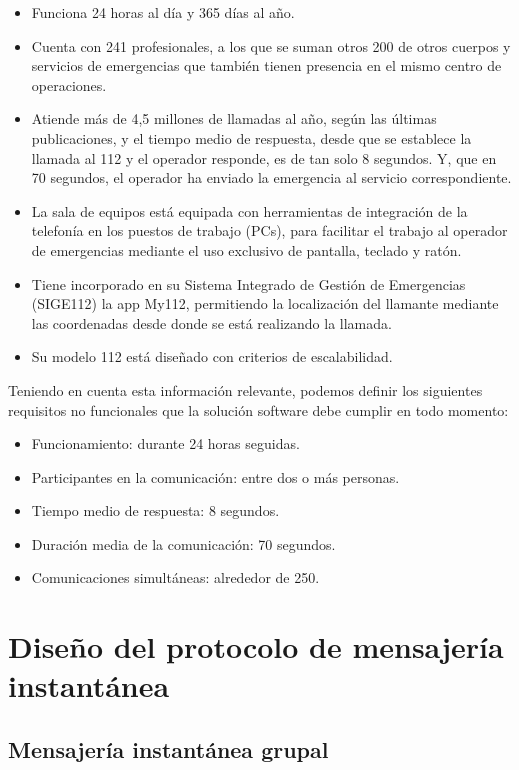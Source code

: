 \begin{itemize}
  \item Funciona 24 horas al día y 365 días al año.
  \item Cuenta con 241 profesionales, a los que se suman otros 200 de otros cuerpos y servicios de emergencias que también tienen presencia en el mismo centro de operaciones.
  \item Atiende más de 4,5 millones de llamadas al año, según las últimas publicaciones, y el tiempo medio de respuesta, desde que se establece la llamada al 112 y el operador responde, es de tan solo 8 segundos. Y, que en 70 segundos, el operador ha enviado la emergencia al servicio correspondiente.
  \item La sala de equipos está equipada con herramientas de integración de la telefonía en los puestos de trabajo (PCs), para facilitar el trabajo al operador de emergencias mediante el uso exclusivo de pantalla, teclado y ratón.
  \item Tiene incorporado en su Sistema Integrado de Gestión de Emergencias (SIGE112) la app My112, permitiendo la localización del llamante mediante las coordenadas desde donde se está realizando la llamada.
  \item Su modelo 112 está diseñado con criterios de escalabilidad.
\end{itemize}

Teniendo en cuenta esta información relevante, podemos definir los siguientes requisitos no funcionales que la solución software debe cumplir en todo momento:

\begin{itemize}
  \item Funcionamiento: durante 24 horas seguidas.
  \item Participantes en la comunicación: entre dos o más personas.
  \item Tiempo medio de respuesta: 8 segundos.
  \item Duración media de la comunicación: 70 segundos.
  \item Comunicaciones simultáneas: alrededor de 250.
\end{itemize}

\clearpage

\section{Diseño del protocolo de mensajería instantánea}

\subsection{Mensajería instantánea grupal}

